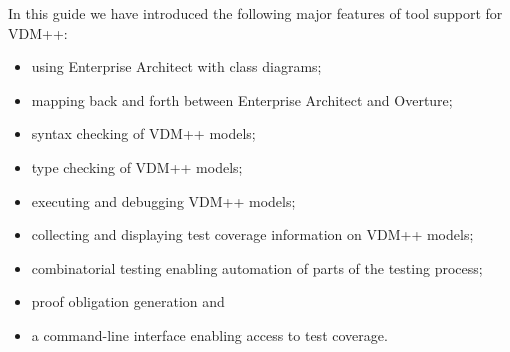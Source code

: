In this guide we have introduced the following major features of tool
support for VDM++:
\begin{itemize}
\item using Enterprise Architect with class diagrams;
\item mapping back and forth between Enterprise Architect and Overture;
\item syntax checking of VDM++ models;
\item type checking of VDM++ models;
\item executing and debugging VDM++ models;
\item collecting and displaying test coverage information on VDM++
  models;
\item combinatorial testing enabling automation of parts of the
  testing process; 
\item proof obligation generation and
\item a command-line interface enabling access to test coverage.
\end{itemize}
